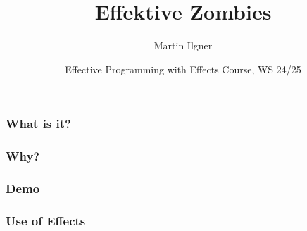 \documentclass{beamer}
\title{Effektive Zombies}
\author{Martin Ilgner}
\institute{University of Tübingen}
\date{Effective Programming with Effects Course, WS 24/25}
\begin{document}
	
	\frame{\titlepage}
	
	\begin{frame}
		\frametitle{What is it?}
	\end{frame}

	\begin{frame}
		\frametitle{Why?}
	\end{frame}
	
	\begin{frame}
		\frametitle{Demo}
	\end{frame}
	
	\begin{frame}
		\frametitle{Use of Effects}
	\end{frame}
	
\end{document}
